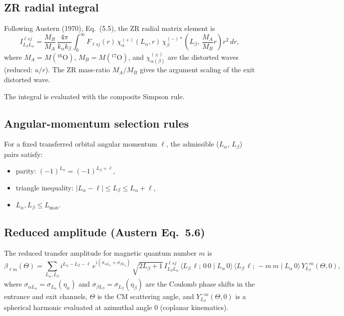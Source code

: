 \documentclass[12pt,a4paper]{article}
\begin{document}
\subsection{ZR radial integral}

Following Austern (1970), Eq.~(5.5), the ZR radial matrix element is
\begin{equation}
  I_{L_\beta L_\alpha}^{\ell s j}
  = \frac{M_B}{M_A}\,\frac{4\pi}{k_\alpha k_\beta}
    \int_0^\infty F_{\ell s j}(r)\,
    \chi_\alpha^{(+)}(L_\alpha, r)\,
    \chi_\beta^{(-)*}\!\!\left(L_\beta,\,\frac{M_A}{M_B}r\right)
    r^2\,dr,
  \label{eq:zr-radial-integral}
\end{equation}
where $M_A = M({}^{16}\mathrm{O})$, $M_B = M({}^{17}\mathrm{O})$, and
$\chi_{\alpha(\beta)}^{(\pm)}$ are the distorted waves (reduced: $u/r$).
The ZR mass-ratio $M_A/M_B$ gives the argument scaling of the exit
distorted wave.

The integral is evaluated with the composite Simpson rule.

\subsection{Angular-momentum selection rules}

For a fixed transferred orbital angular momentum $\ell$,
the admissible ($L_\alpha$, $L_\beta$) pairs satisfy:
\begin{itemize}
  \item parity: $(-1)^{L_\alpha} = (-1)^{L_\beta+\ell}$,
  \item triangle inequality: $|L_\alpha - \ell| \le L_\beta \le L_\alpha + \ell$,
  \item $L_\alpha, L_\beta \le L_\mathrm{max}$.
\end{itemize}

\subsection{Reduced amplitude (Austern Eq.~5.6)}

The reduced transfer amplitude for magnetic quantum number $m$ is
\begin{equation}
  \beta_{\ell m}(\Theta)
  = \sum_{L_\alpha, L_\beta}
    i^{L_\alpha - L_\beta - \ell}\,
    e^{i(\sigma_{\alpha L_\alpha} + \sigma_{\beta L_\beta})}\,
    \sqrt{2L_\beta+1}\,
    I_{L_\beta L_\alpha}^{\ell s j}\,
    \langle L_\beta\,\ell;\,0\,0 \mid L_\alpha\,0\rangle\,
    \langle L_\beta\,\ell;\,-m\,m \mid L_\alpha\,0\rangle\,
    Y_{L_\beta}^{-m}(\Theta, 0),
  \label{eq:austern-5-6}
\end{equation}
where $\sigma_{\alpha L_\alpha} = \sigma_{L_\alpha}(\eta_\alpha)$ and
$\sigma_{\beta L_\beta} = \sigma_{L_\beta}(\eta_\beta)$ are the
Coulomb phase shifts in the entrance and exit channels, $\Theta$ is
the CM scattering angle, and $Y_{L_\beta}^{-m}(\Theta,0)$ is a
spherical harmonic evaluated at azimuthal angle 0 (coplanar
kinematics).
\end{document}

